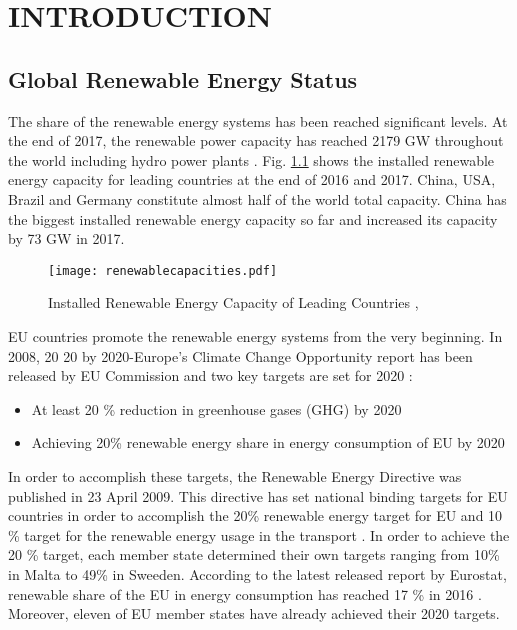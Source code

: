 \chapter{INTRODUCTION}
\label{chp:1}
\section{Global Renewable Energy Status}
The share of the renewable energy systems has been reached significant levels. At the end of 2017, the renewable power capacity has reached 2179 GW throughout the world including hydro power plants \cite{InternationalRenewableEnergyAgencyIRENA2018}. Fig. \ref{renewablecap} shows the installed renewable energy capacity for leading countries at the end of 2016 and 2017. China, USA, Brazil and Germany constitute almost half of the world total capacity. China has the biggest installed renewable energy capacity so far and increased its capacity by 73 GW in 2017.\par
\begin{figure}[h]
	\centering
	\texttt{[image: renewablecapacities.pdf]}
	\caption{Installed Renewable Energy Capacity of Leading Countries \cite{InternationalRenewableEnergyAgencyIRENA2018},\cite{InternationalRenewableEnergyAgency2017}}
	\label{renewablecap}
\end{figure}
EU countries promote the renewable energy systems from the very beginning. In 2008, 20 20 by 2020-Europe's Climate Change Opportunity report has been released by EU Commission and two key targets are set for 2020 \cite{EuropeanCommission2008}: 
\begin{itemize}  
	\item At least 20 \% reduction in greenhouse gases (GHG) by 2020
	\item Achieving 20\% renewable energy share in energy consumption of EU by 2020
\end{itemize}
In order to accomplish these targets, the Renewable Energy Directive was published in 23 April 2009. This directive has set national binding targets for EU countries in order to accomplish the 20\% renewable energy target for EU and 10 \% target for the renewable energy usage in the transport \cite{EuropeanParliament2009}. In order to achieve the 20 \% target, each member state determined their own targets ranging from 10\% in Malta to 49\% in Sweeden. According to the latest released report by Eurostat, renewable share of the EU in energy consumption has reached 17 \% in 2016 \cite{States2016}. Moreover, eleven of EU member states have already achieved their 2020 targets.\par
